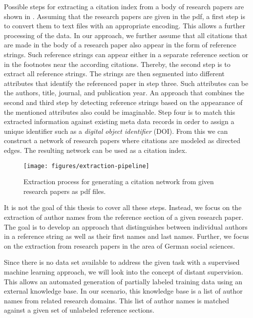 Possible steps for extracting a citation index from a body of research papers are shown in .
Assuming that the research papers are given in the \gls{pdf}, a first step is to convert them to text files with an appropriate encoding.
This allows a further processing of the data.
In our approach, we further assume that all citations that are made in the body of a research paper also appear in the form of reference strings.
Such reference strings can appear either in a separate reference section or in the footnotes near the according citations.
Thereby, the second step is to extract all reference strings.
The strings are then segmented into different attributes that identify the referenced paper in step three.
Such attributes can be the authors, title, journal, and publication year.
An approach that combines the second and third step by detecting reference strings based on the appearance of the mentioned attributes also could be imaginable.
Step four is to match this extracted information against existing meta data records in order to assign a unique identifier such as a \textit{digital object identifier} (DOI).
From this we can construct a network of research papers where citations are modeled as directed edges.
The resulting network can be used as a citation index.
\begin{figure}[t]
\texttt{[image: figures/extraction-pipeline]}
\caption{Extraction process for generating a citation network from given research papers as \gls{pdf} files.}
\label{fig:extraction-pipeline}
\end{figure}

It is not the goal of this thesis to cover all these steps.
Instead, we focus on the extraction of author names from the reference section of a given research paper.
The goal is to develop an approach that distinguishes between individual authors in a reference string as well as their first names and last names.
Further, we focus on the extraction from research papers in the area of German social sciences.

\bigskip

Since there is no data set available to address the given task with a supervised machine learning approach, we will look into the concept of \gls{distant supervision}.
This allows an automated generation of partially labeled training data using an external knowledge base.
In our scenario, this knowledge base is a list of author names from related research domains.
This list of author names is matched against a given set of unlabeled reference sections.

